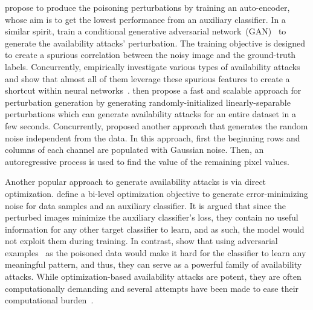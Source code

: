 \documentclass[conference]{IEEEtran}
\theoremstyle{definition}
\theoremstyle{remark}
\theoremstyle{proposition}
\begin{document}
\citet{feng2019con} propose to produce the poisoning perturbations by training an auto-encoder, whose aim is to get the lowest performance from an auxiliary classifier.
In a similar spirit, \citet{tian2022confoundergan} train a conditional generative adversarial network~(GAN)~\citep{goodfellow2014gan} to generate the availability attacks' perturbation.
The training objective is designed to create a spurious correlation between the noisy image and the ground-truth labels.
Concurrently, \citet{yu2022shr} empirically investigate various types of availability attacks and show that almost all of them leverage these spurious features to create a shortcut within neural networks~\citep{geirhos2020shortcut}.
\citet{yu2022shr} then propose a fast and scalable approach for perturbation generation by generating randomly-initialized linearly-separable perturbations which can generate availability attacks for an entire dataset in a few seconds.
Concurrently, \citet{sandoval2022ar} proposed another approach that generates the random noise independent from the data.
In this approach, first the beginning rows and columns of each channel are populated with Gaussian noise.
Then, an autoregressive process is used to find the value of the remaining pixel values.

Another popular approach to generate availability attacks is via direct optimization.
\citet{huang2021emn} define a bi-level optimization objective to generate error-minimizing noise for data samples and an auxiliary classifier.
It is argued that since the perturbed images minimize the auxiliary classifier's loss, they contain no useful information for any other target classifier to learn, and as such, the model would not exploit them during training.
In contrast, \citet{fowl2021tap} show that using adversarial examples~\citep{szegedy2014intriguing, goodfellow2014explaining} as the poisoned data would make it hard for the classifier to learn any meaningful pattern, and thus, they can serve as a powerful family of availability attacks.
While optimization-based availability attacks are potent, they are often computationally demanding and several attempts have been made to ease their computational burden~\citep{fowl2021preventing, zhang2021data}.
\end{document}
